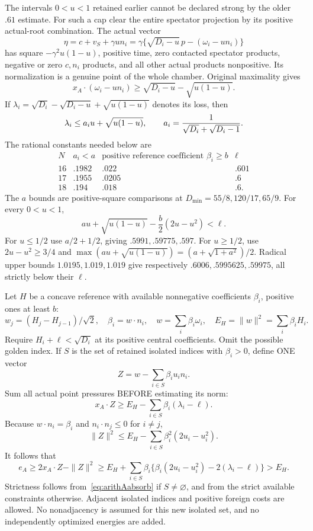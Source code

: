 The intervals \(0<u<1\) retained earlier cannot be declared
strong by the older \(.61\) estimate.
For such a cap clear the entire spectator projection by its
positive actual-root combination.  The actual vector
\[
 \eta=c+v_S+\gamma u n_i
      =\gamma\{\sqrt{D_i-u}\,p-(\omega_i-un_i)\}
\]
has square \(-\gamma^2u(1-u)\), positive time, zero contacted
spectator products, negative or zero \(c,n_i\) products, and
all other actual products nonpositive.
Its normalization is a genuine point of the whole chamber.
Original maximality gives
\[
 x_A\cdot(\omega_i-un_i)
 \ge\sqrt{D_i-u}-\sqrt{u(1-u)}.
\]
If \(\lambda_i=\sqrt{D_i}-\sqrt{D_i-u}+\sqrt{u(1-u)}\)
denotes its loss, then
\[
 \lambda_i\le a_i u+\sqrt{u(1-u)},\qquad
 a_i={1\over\sqrt{D_i}+\sqrt{D_i-1}}.
\]
The rational constants needed below are
\[
\begin{array}{c|ccc}
N&a_i<a&\text{positive reference coefficient }\beta_i\ge b&
 \ell\\ \hline
16&.1982&.022&.601\\
17&.1955&.0205&.6\\
18&.194&.018&.6 .
\end{array}
\]
The \(a\) bounds are positive-square comparisons at
\(D_{\min}=55/8,120/17,65/9\).
For every \(0<u<1\),
\[
 a u+\sqrt{u(1-u)}-\frac b2(2u-u^2)<\ell.
\tag{Aabsorb}\label{eq:arithAabsorb}
\]
For \(u\le1/2\) use \(a/2+1/2\), giving
\(.5991,.59775,.597\).
For \(u\ge1/2\), use \(2u-u^2\ge3/4\) and
\(\max(au+\sqrt{u(1-u)})=(a+\sqrt{1+a^2})/2\).
Radical upper bounds \(1.0195,1.019,1.019\) give respectively
\(.6006,.5995625,.59975\), all strictly below their \(\ell\).

Let \(H\) be a concave reference with available nonnegative
coefficients \(\beta_i\), positive ones at least \(b\):
\[
 w_j=(H_j-H_{j-1})/\sqrt2,\quad
 \beta_i=w\cdot n_i,\quad
 w=\sum_i\beta_i\omega_i,\quad
 E_H=\|w\|^2=\sum_i\beta_iH_i .
\]
Require \(H_i+\ell<\sqrt{D_i}\) at its positive central
coefficients.  Omit the possible golden index.
If \(S\) is the set of retained isolated indices with
\(\beta_i>0\), define ONE vector
\[
                       Z=w-\sum_{i\in S}\beta_i u_i n_i .
\]
Sum all actual point pressures BEFORE estimating its norm:
\[
 x_A\cdot Z\ge E_H-\sum_{i\in S}\beta_i(\lambda_i-\ell).
\]
Because \(w\cdot n_i=\beta_i\) and
\(n_i\cdot n_j\le0\) for \(i\ne j\),
\[
 \|Z\|^2\le E_H-\sum_{i\in S}\beta_i^2(2u_i-u_i^2).
\]
It follows that
\[
 e_A\ge2x_A\cdot Z-\|Z\|^2
 \ge E_H+\sum_{i\in S}\beta_i
       \{\beta_i(2u_i-u_i^2)-2(\lambda_i-\ell)\}>E_H.
\tag{Asummed}\label{eq:arithAsummed}
\]
Strictness follows from~\eqref{eq:arithAabsorb} if \(S\ne\varnothing\),
and from the strict available constraints otherwise.
Adjacent isolated indices and positive foreign costs are allowed.
No nonadjacency is assumed for this new isolated set, and no
independently optimized energies are added.


